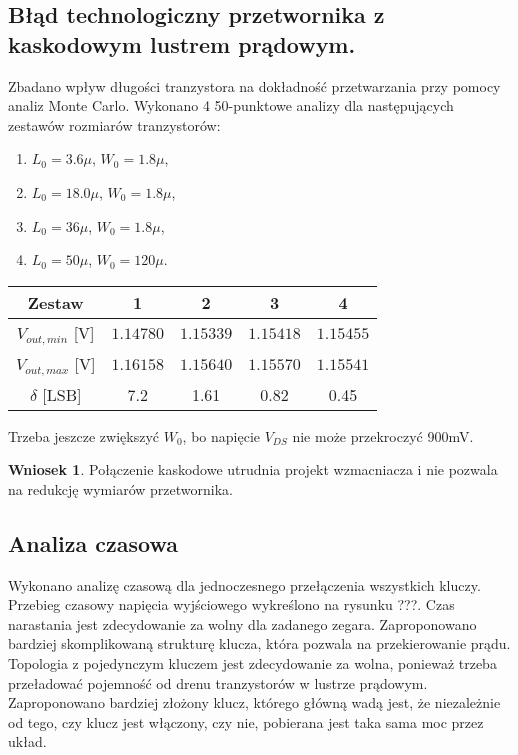 \documentclass[10pt,a4paper,twoside]{report}
\theoremstyle{definition}
\theoremstyle{definition}
\theoremstyle{definition}
\theoremstyle{definition}
\theoremstyle{definition}
\newtheorem{wniosek}{Wniosek}[section]
\begin{document}
{{{	\subsection{Błąd technologiczny przetwornika z kaskodowym lustrem prądowym.}
	{	Zbadano wpływ długości tranzystora na dokładność przetwarzania przy pomocy analiz Monte Carlo. Wykonano 4 50-punktowe analizy dla następujących zestawów rozmiarów tranzystorów:
	\begin{enumerate}
		\item $L_0 = 3.6\mu$, $W_0 = 1.8\mu$,
		\item $L_0 = 18.0\mu$, $W_0 = 1.8\mu$,
		\item $L_0 = 36\mu$, $W_0 = 1.8\mu$,
		\item $L_0 = 50\mu$, $W_0 = 120\mu$.
	\end{enumerate}

	\begin{center}
		\begin{tabular}{|c|c|c|c|c|}
			\hline 
			Zestaw & 1 & 2 & 3  & 4\\ 
			\hline 
			$V_{out,min}$ [V] & $1.14780$ & $1.15339$ & $1.15418$ & $1.15455$ \\ 
			\hline
			$V_{out,max}$ [V] & $1.16158$ & $1.15640$ & $1.15570$ & $1.15541$\\ 
			\hline 
			$\delta$ [LSB]  & 7.2 & 1.61 & 0.82 & 0.45\\
			\hline
		\end{tabular} 
	\end{center}
	Trzeba jeszcze zwiększyć $W_0$, bo napięcie $V_{DS}$ nie może przekroczyć 900mV.
	\begin{wniosek}{Połączenie kaskodowe utrudnia projekt wzmacniacza i nie pozwala na redukcję wymiarów przetwornika.}
	\end{wniosek}

	\subsection{Analiza czasowa}
	{ Wykonano analizę czasową dla jednoczesnego przełączenia wszystkich kluczy. Przebieg czasowy napięcia wyjściowego wykreślono na rysunku ???. Czas narastania jest zdecydowanie za wolny dla zadanego zegara. Zaproponowano bardziej skomplikowaną strukturę klucza, która pozwala na przekierowanie prądu. Topologia z pojedynczym kluczem jest zdecydowanie za wolna, ponieważ trzeba przeładować pojemność od drenu tranzystorów w lustrze prądowym. Zaproponowano bardziej złożony klucz, którego główną wadą jest, że niezależnie od tego, czy klucz jest włączony, czy nie, pobierana jest taka sama moc przez układ. }
	
}}}}
\end{document}
